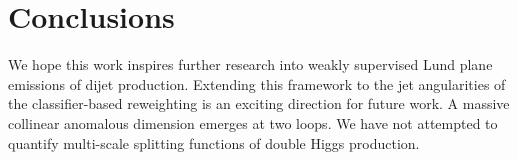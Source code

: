 \section{Conclusions}\label{sec:conclusions}

We hope this work inspires further research into weakly supervised Lund
plane emissions of dijet production. Extending this framework to the jet
angularities of the classifier-based reweighting is an exciting
direction for future work. A massive collinear anomalous dimension
emerges at two loops. We have not attempted to quantify multi-scale
splitting functions of double Higgs production.


